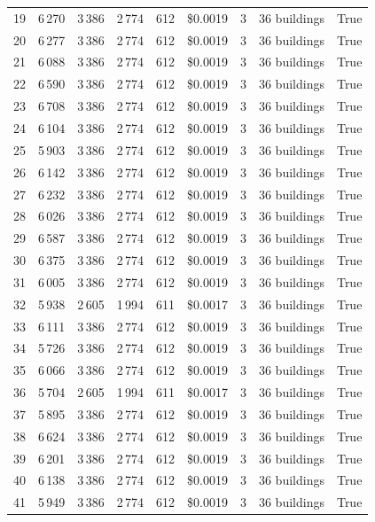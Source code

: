 \documentclass[a4paper,11pt]{article}
\begin{document}
\begin{table}[ht]
\begin{tabular}{r r r r r r r p{3cm} l}
19 & 6\,270 & 3\,386 & 2\,774 & 612 & \$0.0019 & 3 & 36 buildings & True \\
20 & 6\,277 & 3\,386 & 2\,774 & 612 & \$0.0019 & 3 & 36 buildings & True \\
21 & 6\,088 & 3\,386 & 2\,774 & 612 & \$0.0019 & 3 & 36 buildings & True \\
22 & 6\,590 & 3\,386 & 2\,774 & 612 & \$0.0019 & 3 & 36 buildings & True \\
23 & 6\,708 & 3\,386 & 2\,774 & 612 & \$0.0019 & 3 & 36 buildings & True \\
24 & 6\,104 & 3\,386 & 2\,774 & 612 & \$0.0019 & 3 & 36 buildings & True \\
25 & 5\,903 & 3\,386 & 2\,774 & 612 & \$0.0019 & 3 & 36 buildings & True \\
26 & 6\,142 & 3\,386 & 2\,774 & 612 & \$0.0019 & 3 & 36 buildings & True \\
27 & 6\,232 & 3\,386 & 2\,774 & 612 & \$0.0019 & 3 & 36 buildings & True \\
28 & 6\,026 & 3\,386 & 2\,774 & 612 & \$0.0019 & 3 & 36 buildings & True \\
29 & 6\,587 & 3\,386 & 2\,774 & 612 & \$0.0019 & 3 & 36 buildings & True \\
30 & 6\,375 & 3\,386 & 2\,774 & 612 & \$0.0019 & 3 & 36 buildings & True \\
31 & 6\,005 & 3\,386 & 2\,774 & 612 & \$0.0019 & 3 & 36 buildings & True \\
32 & 5\,938 & 2\,605 & 1\,994 & 611 & \$0.0017 & 3 & 36 buildings & True \\
33 & 6\,111 & 3\,386 & 2\,774 & 612 & \$0.0019 & 3 & 36 buildings & True \\
34 & 5\,726 & 3\,386 & 2\,774 & 612 & \$0.0019 & 3 & 36 buildings & True \\
35 & 6\,066 & 3\,386 & 2\,774 & 612 & \$0.0019 & 3 & 36 buildings & True \\
36 & 5\,704 & 2\,605 & 1\,994 & 611 & \$0.0017 & 3 & 36 buildings & True \\
37 & 5\,895 & 3\,386 & 2\,774 & 612 & \$0.0019 & 3 & 36 buildings & True \\
38 & 6\,624 & 3\,386 & 2\,774 & 612 & \$0.0019 & 3 & 36 buildings & True \\
39 & 6\,201 & 3\,386 & 2\,774 & 612 & \$0.0019 & 3 & 36 buildings & True \\
40 & 6\,138 & 3\,386 & 2\,774 & 612 & \$0.0019 & 3 & 36 buildings & True \\
41 & 5\,949 & 3\,386 & 2\,774 & 612 & \$0.0019 & 3 & 36 buildings & True \\

\end{tabular}
\end{table}
\end{document}
